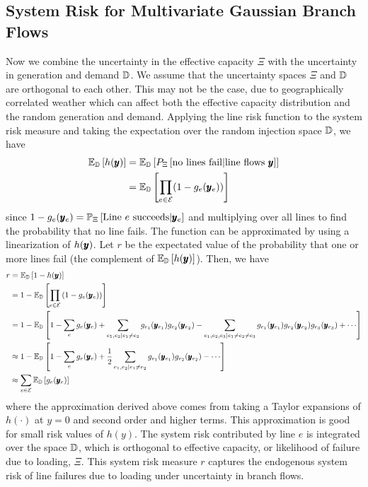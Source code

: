 \subsection{System Risk for Multivariate Gaussian Branch Flows}
Now we combine the uncertainty in the effective capacity $\Xi$ with the uncertainty in generation and demand $\mathbb{D}$.  We assume that the uncertainty spaces $\Xi$ and $\mathbb{D}$ are orthogonal to each other.  This may not be the case, due to geographically correlated weather which can affect both the effective capacity distribution and the random generation and demand.  Applying the line risk function  to the system risk measure  and taking the expectation over the random injection space $\mathbb{D}$, we have
\begin{align}\label{nofailuncertainty}
  \mathbb{E}_{\mathbb{D}} \left[ h(\pmb{y}) \right]  &= \mathbb{E}_{\mathbb{D}} \left[ P_\Xi \left[ \mbox{no lines fail} | \mbox{line flows } \pmb{y}\right] \right]\\
  &= \mathbb{E}_{\mathbb{D}} \left[  \prod_{e \in \mathcal{E}} (1 - g_e(\pmb{y}_e) ) \right]
\end{align}
since $ 1- g_e(\pmb{y}_e) = \mathbb{P}_{\Xi} \left[ \text{Line }e\text{ succeeds} | \pmb{y}_e \right] $ and multiplying over all lines to find the probability that no line fails. The function  can be approximated by using a linearization of $h(\pmb{y})$.  Let $r$ be the expectated value of the probability that one or more lines fail (the complement of $\mathbb{E}_{\mathbb{D}} \left[ h(\pmb{y}) \right]$). Then, we have
\begin{align*}\label{linear}
r &= \E{\bD}{1 - h(\ry)}  \\
 &= 1 - \E{\bD}{\prod_{e \in \cE}\left( 1 - g_e(\hry_e)\right) } \\
  &= 1 - \E{\bD}{ 1 - \sum_e g_e(\ry_e) + \sum_{e_1,e_2|e_1\neq e_2} g_{e_1} (\ry_{e_1}) g_{e_2}(\ry_{e_2}) - \sum_{e_1,e_2,e_3|e_1\neq e_2 \neq e_3} g_{e_1} (\ry_{e_1}) g_{e_2}(\ry_{e_2}) g_{e_3} (\ry_{e_3}) + \cdots } \\
  & \approx 1 - \E{\bD}{ 1 - \sum_{e} g_e(\ry_e) + \frac{1}{2} \sum_{e_1,e_2|e_1\neq e_2} g_{e_1} (\ry_{e_1}) g_{e_2}(\ry_{e_2}) - \cdots } \\
 &\approx \sum_{e \in \cE} \E{\bD}{g_e(\hry_e)}
\end{align*}
where the approximation derived above comes from taking a Taylor expansions of $h(\cdot)$ at $y=0$ and second order and higher terms.  This approximation is good for small risk values of $h(y)$.
The system risk contributed by line $e$ is integrated over the space $\mathbb{D}$, which is orthogonal to effective capacity, or likelihood of failure due to loading, $\Xi$.  This system risk measure $r$ captures the endogenous system risk of line failures due to loading under uncertainty in branch flows.

